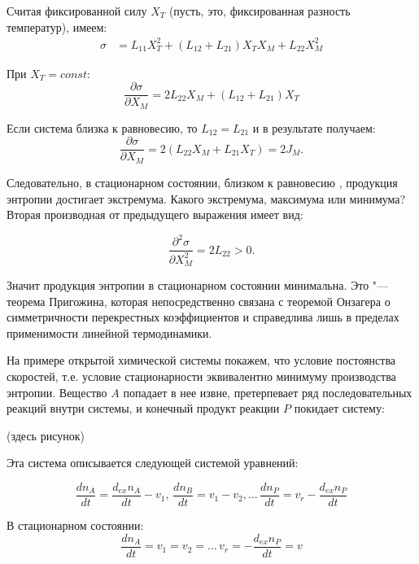\documentclass[12pt,a4paper,oneside]{book}
\begin{document}
Считая фиксированной силу $X_T$ (пусть, это, фиксированная разность температур), имеем:
\begin{align}
		\sigma & = L_{11} X_T^{2}+( L_{12} + L_{21}) X_T X_M + L_{22} X_M^{2} 
\end{align}

При $X_T = const$:
\begin{equation}
 \frac{\partial \sigma}{\partial X_M} = 2 L_{22} X_M + ( L_{12} + L_{21}) X_T 
\end{equation}

Если система близка к равновесию, то $L_{12} = L_{21}$ и в результате получаем:
\begin{equation}
 \frac{\partial \sigma}{\partial X_M} = 2 ( L_{22} X_M + L_{21} X_T ) = 2 J_M . 
\end{equation}

Следовательно, в стационарном состоянии, близком к равновесию , продукция энтропии достигает экстремума. Какого экстремума, максимума или минимума? Вторая производная от предыдущего выражения имеет вид:

\begin{equation}
 \frac{\partial^{2} \sigma}{\partial X_M^{2}} = 2 L_{22} > 0 .
\end{equation}

Значит продукция энтропии в стационарном состоянии минимальна. Это "--- теорема Пригожина, которая непосредственно связана с теоремой Онзагера о симметричности перекрестных коэффициентов и справедлива лишь в пределах применимости линейной термодинамики. 


На примере открытой химической системы покажем, что условие постоянства скоростей, т.е. условие стационарности эквивалентно минимуму производства энтропии. Вещество $A$ попадает в нее извне, претерпевает ряд последовательных реакций внутри системы, и конечный продукт реакции $P$ покидает систему:

(здесь рисунок)

Эта система описывается следующей системой уравнений:

\begin{equation}
	\frac{d n_A}{d t} = \frac{d_{ex} n_A}{d t} - v_1, \, \frac{d n_B}{d t} = v_1 - v_2,\ldots \, \frac{d n_P}{d t} = v_r -\frac{d_{ex} n_P}{d t}
\end{equation}

В стационарном состоянии:
\begin{equation}
	\frac{d n_A}{d t} = v_1 = v_2 = \ldots \, v_r = - \frac{d_{ex} n_P}{d t} = v
\end{equation}
\end{document}
